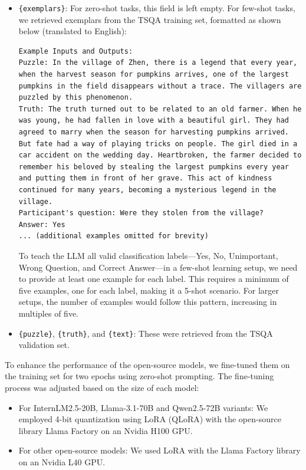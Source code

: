 \documentclass[conference]{IEEEtran}
\begin{document}
\begin{itemize}
    \item \texttt{\{exemplars\}}: For zero-shot tasks, this field is left empty. For few-shot tasks, we retrieved exemplars from the TSQA training set, formatted as shown below (translated to English):
\small{
\begin{verbatim}
Example Inputs and Outputs:
Puzzle: In the village of Zhen, there is a legend that every year, when the harvest season for pumpkins arrives, one of the largest pumpkins in the field disappears without a trace. The villagers are puzzled by this phenomenon.
Truth: The truth turned out to be related to an old farmer. When he was young, he had fallen in love with a beautiful girl. They had agreed to marry when the season for harvesting pumpkins arrived. But fate had a way of playing tricks on people. The girl died in a car accident on the wedding day. Heartbroken, the farmer decided to remember his beloved by stealing the largest pumpkins every year and putting them in front of her grave. This act of kindness continued for many years, becoming a mysterious legend in the village.
Participant's question: Were they stolen from the village?
Answer: Yes
... (additional examples omitted for brevity)
\end{verbatim}

To teach the LLM all valid classification labels—Yes, No, Unimportant, Wrong Question, and Correct Answer—in a few-shot learning setup, we need to provide at least one example for each label. This requires a minimum of five examples, one for each label, making it a 5-shot scenario. For larger setups, the number of examples would follow this pattern, increasing in multiples of five.
}
    \item \texttt{\{puzzle\}}, \texttt{\{truth\}}, and \texttt{\{text\}}: These were retrieved from the TSQA validation set.
\end{itemize}

To enhance the performance of the open-source models, we fine-tuned them on the training set for two epochs using zero-shot prompting. The fine-tuning process was adjusted based on the size of each model:

\begin{itemize}
    \item For InternLM2.5-20B, Llama-3.1-70B and Qwen2.5-72B variants: We employed 4-bit quantization using LoRA (QLoRA) with the open-source library Llama Factory \cite{zheng2024llamafactory} on an Nvidia H100 GPU.
    \item For other open-source models: We used LoRA with the Llama Factory library on an Nvidia L40 GPU.
\end{itemize}
\end{document}
